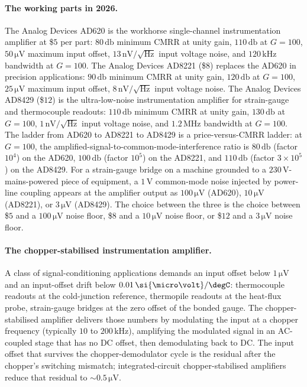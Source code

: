 \paragraph{The working parts in 2026.} The Analog Devices AD620
\cite{text:ch05t3b-adi-ad620-datasheet} is the workhorse
single-channel instrumentation amplifier at
\$$5$ per part: $80 \,\si{\decibel}$ minimum CMRR at unity gain,
$110 \,\si{\decibel}$ at $G = 100$, $50 \,\si{\micro\volt}$ maximum
input offset, $13 \,\si{\nano\volt}/\sqrt{\si{\hertz}}$ input
voltage noise, and $120 \,\si{\kilo\hertz}$ bandwidth at $G = 100$.
The Analog Devices AD8221
\cite{text:ch05t3b-adi-ad8221-datasheet} (\$$8$) replaces the
AD620 in precision applications: $90 \,\si{\decibel}$
minimum CMRR at unity gain, $120 \,\si{\decibel}$ at $G = 100$,
$25 \,\si{\micro\volt}$ maximum input offset,
$8 \,\si{\nano\volt}/\sqrt{\si{\hertz}}$ input voltage noise. The
Analog Devices AD8429 \cite{text:ch05t3b-adi-ad8429-datasheet}
(\$$12$) is the ultra-low-noise instrumentation amplifier
for strain-gauge and thermocouple readouts:
$110 \,\si{\decibel}$ minimum CMRR at unity gain, $130
\,\si{\decibel}$ at $G = 100$, $1 \,\si{\nano\volt}/\sqrt{\si{
\hertz}}$ input voltage noise, and $1.2 \,\si{\mega\hertz}$
bandwidth at $G = 100$. The ladder from AD620 to AD8221 to
AD8429 is a price-versus-CMRR ladder: at $G = 100$, the
amplified-signal-to-common-mode-interference ratio is
$80 \,\si{\decibel}$ (factor $10^{4}$) on the AD620,
$100 \,\si{\decibel}$ (factor $10^{5}$) on the AD8221,
and $110 \,\si{\decibel}$ (factor $3 \times 10^{5}$) on the AD8429.
For a strain-gauge bridge on a machine grounded to a
$230 \,\si{\volt}$-mains-powered piece of equipment, a
$1 \,\si{\volt}$ common-mode noise injected by power-line coupling
appears at the amplifier output as $100 \,\si{\micro\volt}$ (AD620),
$10 \,\si{\micro\volt}$ (AD8221), or $3 \,\si{\micro\volt}$
(AD8429). The choice between the three is the choice between \$$5$
and a $100 \,\si{\micro\volt}$ noise floor, \$$8$ and a
$10 \,\si{\micro\volt}$ noise floor, or \$$12$ and a
$3 \,\si{\micro\volt}$ noise floor.

\paragraph{The chopper-stabilised instrumentation amplifier.} A
class of signal-conditioning applications demands an
input offset below $1 \,\si{\micro\volt}$ and an input-offset drift
below $0.01 \,\si{\micro\volt}/\degC$: thermocouple readouts
at the cold-junction reference, thermopile readouts at the
heat-flux probe, strain-gauge bridges at the zero offset of the
bonded gauge. The chopper-stabilised amplifier delivers those
numbers by modulating the input at a chopper frequency (typically
$10$ to $200 \,\si{\kilo\hertz}$), amplifying the modulated signal
in an AC-coupled stage that has no DC offset, then demodulating
back to DC. The input offset that survives the chopper-demodulator
cycle is the residual after the chopper's switching mismatch;
integrated-circuit chopper-stabilised amplifiers reduce that
residual to $\sim 0.5 \,\si{\micro\volt}$.

